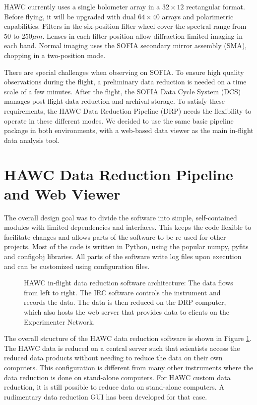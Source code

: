 HAWC currently uses a single bolometer array in a $32\times12$
rectangular format. Before flying, it will be upgraded with dual
$64\times40$ arrays and polarimetric capabilities. Filters in the
six-position filter wheel cover the spectral range from 50 to $250\mu
m$. Lenses in each filter position allow diffraction-limited imaging in
each band. Normal imaging uses the SOFIA secondary mirror assembly
(SMA), chopping in a two-position mode.

There are special challenges when observing on SOFIA. To ensure high
quality observations during the flight, a preliminary data reduction
is needed on a time scale of a few minutes. After the flight, the
SOFIA Data Cycle System (DCS) \citep[see][]{P050_adassxxii} manages
post-flight data reduction and archival storage. To satisfy these
requirements, the HAWC Data Reduction Pipeline (DRP) needs the
flexibility to operate in these different modes. We decided to use the
same basic pipeline package in both environments, with a web-based data
viewer as the main in-flight data analysis tool.

\section{HAWC Data Reduction Pipeline and Web Viewer}

The overall design goal was to divide the software into simple,
self-contained modules with limited dependencies and interfaces. This
keeps the code flexible to facilitate changes and allows parts of the
software to be re-used for other projects. Most of the code is written
in Python, using the popular numpy, pyfits and configobj
libraries. All parts of the software write log files upon execution
and can be customized using configuration files.

\begin{figure}

\caption{HAWC in-flight data reduction software architecture: The data
  flows from left to right. The IRC software controls the instrument
  and records the data. The data is then reduced on the DRP computer,
  which also hosts the web server that provides data to clients on the
  Experimenter Network.}

\label{fig_struct}

\end{figure}

The overall structure of the HAWC data reduction software is shown in
Figure \ref{fig_struct}. The HAWC data is reduced on a central server
such that scientists access the reduced data products without needing
to reduce the data on their own computers. This configuration is
different from many other instruments where the data reduction is done
on stand-alone computers. For HAWC custom data reduction, it is still
possible to reduce data on stand-alone computers. A rudimentary data
reduction GUI has been developed for that case.

